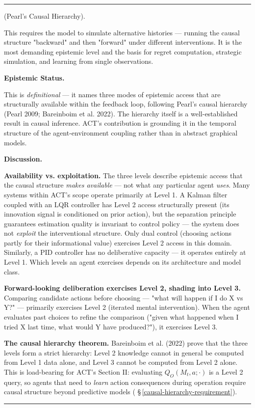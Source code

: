 \documentclass[11pt,oneside]{article}
\newcounter{claim}[section]
\renewcommand{\theclaim}{\thesection.\arabic{claim}}
\newenvironment{segment}[2]{%
  \refstepcounter{claim}%
  \bigskip\noindent\hrule\smallskip
  \noindent{\bfseries #1~\theclaim}\enskip(#2).\par\smallskip
  \noindent\ignorespaces
}{%
  \par\smallskip\noindent\hrule\bigskip
}
\newenvironment{definition}[1][]{\begin{segment}{Definition}{#1}}{\end{segment}}
\begin{document}
\begin{definition}[Pearl's Causal Hierarchy]
This requires the model to simulate alternative histories — running the causal structure "backward" and then "forward" under different interventions. It is the most demanding epistemic level and the basis for regret computation, strategic simulation, and learning from single observations.


\medskip\noindent\textbf{Epistemic Status.}


This is \textit{definitional} — it names three modes of epistemic access that are structurally available within the feedback loop, following Pearl's causal hierarchy (Pearl 2009; Bareinboim et al. 2022). The hierarchy itself is a well-established result in causal inference. ACT's contribution is grounding it in the temporal structure of the agent-environment coupling rather than in abstract graphical models.


\medskip\noindent\textbf{Discussion.}


\textbf{Availability vs. exploitation.} The three levels describe epistemic access that the causal structure \textit{makes available} — not what any particular agent \textit{uses}. Many systems within ACT's scope operate primarily at Level 1. A Kalman filter coupled with an LQR controller has Level 2 access structurally present (its innovation signal is conditioned on prior action), but the separation principle guarantees estimation quality is invariant to control policy — the system does not \textit{exploit} the interventional structure. Only dual control (choosing actions partly for their informational value) exercises Level 2 access in this domain. Similarly, a PID controller has no deliberative capacity — it operates entirely at Level 1. Which levels an agent exercises depends on its architecture and model class.

\textbf{Forward-looking deliberation exercises Level 2, shading into Level 3.} Comparing candidate actions before choosing — "what will happen if I do X vs Y?" — primarily exercises Level 2 (iterated mental intervention). When the agent evaluates past choices to refine the comparison ("given what happened when I tried X last time, what would Y have produced?"), it exercises Level 3.

\textbf{The causal hierarchy theorem.} Bareinboim et al. (2022) prove that the three levels form a strict hierarchy: Level 2 knowledge cannot in general be computed from Level 1 data alone, and Level 3 cannot be computed from Level 2 alone. This is load-bearing for ACT's Section II: evaluating $Q_O(M_t, a; \cdot)$ is a Level 2 query, so agents that need to \textit{learn} action consequences during operation require causal structure beyond predictive models ( \S\,\ref{causal-hierarchy-requirement}).


\end{definition}
\end{document}
